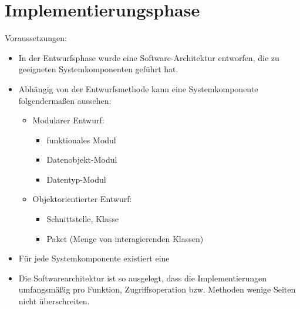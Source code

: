 \section{Implementierungsphase}

Voraussetzungen:
\begin{itemize}
    \item In der Entwurfsphase wurde eine Software-Architektur entworfen, die zu geeigneten Systemkomponenten geführt hat.
    \item Abhängig von der Entwurfsmethode kann eine Systemkomponente folgendermaßen aussehen:
    \begin{itemize}
        \item Modularer Entwurf:
        \begin{itemize}
            \item funktionales Modul
            \item Datenobjekt-Modul
            \item Datentyp-Modul
        \end{itemize}
        \item Objektorientierter Entwurf:
        \begin{itemize}
            \item Schnittstelle, Klasse
            \item Paket (Menge von interagierenden Klassen)
        \end{itemize}
    \end{itemize}
    \item Für jede Systemkomponente existiert eine 
    \item Die Softwarearchitektur ist so ausgelegt, dass die Implementierungen umfangsmäßig pro Funktion, Zugriffsoperation bzw. Methoden wenige Seiten nicht überschreiten.
\end{itemize}   

